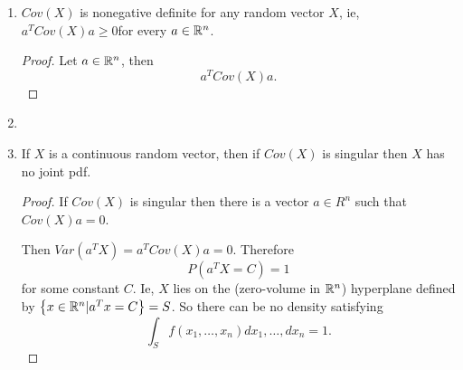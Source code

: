 \begin{enumerate}
	\item $Cov\left( X \right) $ is nonegative definite for any random vector $X$, ie, $a^{T}Cov\left( X \right) a \ge  0$for every $a \in \mathbb{R}^{n}$. 
		\begin{proof}
			Let $a \in  \mathbb{R}^{n}$, then 
			\[
				a ^{T}Cov\left( X \right) a
			.\] 
		\end{proof}
	\item 
	\item If $X$ is a continuous random vector, then if $Cov\left( X \right) $ is singular then $X$ has no joint pdf. 
		\begin{proof}
			If $Cov\left( X \right) $ is singular then there is a vector $a \in  R^{n}$ such that $Cov\left( X \right) a = 0$. 

			Then $Var\left( a^{T}X \right) = a^{T}Cov\left( X \right) a = 0 $. Therefore 
			\[
				P\left( a^{T}X = C \right)  = 1
			\] 
			for some constant $C$. Ie, $X$ lies on the (zero-volume in  $\mathbb{R}^{n}$) hyperplane defined by $\left\{ x \in  \mathbb{R}^{n} | a ^{T}x = C \right\}  = S$. So there can be no density satisfying 
			\[
				\int_{S} f\left( x_{1} , \ldots , x_{n} \right)  dx_{1} , \ldots , dx_{n}  = 1
			.\] 
		\end{proof}
\end{enumerate}
